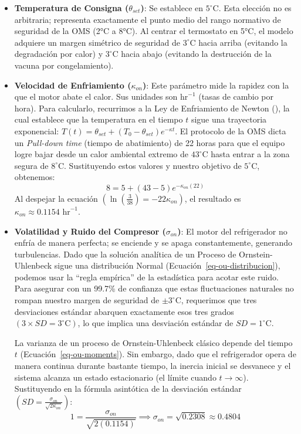 \documentclass[
  spanish,
  us-letterpaper,
]{scrreprt}
\numberwithin{equation}{section}
\theoremstyle{plain}
\theoremstyle{plain}
\theoremstyle{definition}
\theoremstyle{plain}
\theoremstyle{remark}
\begin{document}
\begin{itemize}
\item
  \textbf{Temperatura de Consigna (\(\theta_{set}\))}: Se establece en
  \textbf{\(5^\circ \text{C}\)}. Esta elección no es arbitraria;
  representa exactamente el punto medio del rango normativo de seguridad
  de la OMS (2°C a 8°C). Al centrar el termostato en 5°C, el modelo
  adquiere un margen simétrico de seguridad de \(3^\circ \text{C}\)
  hacia arriba (evitando la degradación por calor) y
  \(3^\circ \text{C}\) hacia abajo (evitando la destrucción de la vacuna
  por congelamiento).
\item
  \textbf{Velocidad de Enfriamiento (\(\kappa_{on}\))}: Este parámetro
  mide la rapidez con la que el motor abate el calor. Sus unidades son
  \(\text{hr}^{-1}\) (tasas de cambio por hora). Para calcularlo,
  recurrimos a la Ley de Enfriamiento de Newton
  (), la cual establece
  que la temperatura en el tiempo \(t\) sigue una trayectoria
  exponencial:
  \(T(t) = \theta_{set} + (T_0 - \theta_{set}) e^{-\kappa t}\). El
  protocolo de la OMS dicta un \emph{Pull-down time} (tiempo de
  abatimiento) de 22 horas para que el equipo logre bajar desde un calor
  ambiental extremo de \(43^\circ \text{C}\) hasta entrar a la zona
  segura de \(8^\circ \text{C}\). Sustituyendo estos valores y nuestro
  objetivo de \(5^\circ \text{C}\), obtenemos:
  \[8 = 5 + (43 - 5) e^{-\kappa_{on} (22)}\] Al despejar la ecuación
  \(\left(\ln\left(\frac{3}{38}\right) = -22 \kappa_{on}\right)\), el
  resultado es \textbf{\(\kappa_{on} \approx 0.1154 \text{ hr}^{-1}\)}.
\item
  \textbf{Volatilidad y Ruido del Compresor (\(\sigma_{on}\))}: El motor
  del refrigerador no enfría de manera perfecta; se enciende y se apaga
  constantemente, generando turbulencias. Dado que la solución analítica
  de un Proceso de Ornstein-Uhlenbeck sigue una distribución Normal
  (Ecuación~\ref{eq-ou-distribucion}), podemos usar la ``regla
  empírica'' de la estadística para acotar este ruido. Para asegurar con
  un 99.7\% de confianza que estas fluctuaciones naturales no rompan
  nuestro margen de seguridad de \(\pm 3^\circ \text{C}\), requerimos
  que tres desviaciones estándar abarquen exactamente esos tres grados
  \(\left( 3 \times SD = 3^\circ \text{C}\right)\), lo que implica una
  desviación estándar de \(SD = 1^\circ \text{C}\).

  La varianza de un proceso de Ornstein-Uhlenbeck clásico depende del
  tiempo \(t\) (Ecuación~\ref{eq-ou-moments}). Sin embargo, dado que el
  refrigerador opera de manera continua durante bastante tiempo, la
  inercia inicial se desvanece y el sistema alcanza un estado
  estacionario (el límite cuando \(t \to \infty\)). Sustituyendo en la
  fórmula asintótica de la desviación estándar
  \(\left(SD = \frac{\sigma_{on}}{\sqrt{2\kappa_{on}}}\right)\):
  \[1 = \frac{\sigma_{on}}{\sqrt{2(0.1154)}} \implies \sigma_{on} = \sqrt{0.2308} \approx 0.4804\]
\end{itemize}
\end{document}
